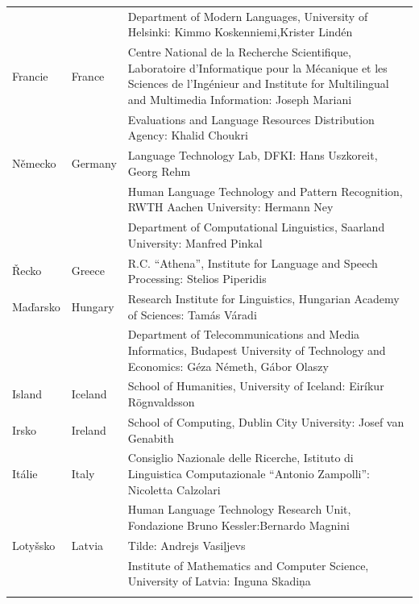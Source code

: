 \documentclass[]{../../metanetpaper}
\begin{document}
\begin{longtable}{@{}llp{113mm}@{}}
  & & Department of Modern Languages, University of Helsinki: Kimmo Koskenniemi,\newline Krister Lindén \\ \addlinespace
  Francie & \textcolor{grey1}{France} & Centre National de la Recherche Scientifique, Laboratoire d'Informatique pour la Mécanique et les Sciences de l'Ingénieur and Institute for Multilingual and Multimedia Information: Joseph Mariani \\ \addlinespace
  & & Evaluations and Language Resources Distribution Agency: Khalid Choukri\\ \addlinespace
  Německo & \textcolor{grey1}{Germany} & Language Technology Lab, DFKI: Hans Uszkoreit, Georg Rehm\\ \addlinespace
  & & Human Language Technology and Pattern Recognition, RWTH Aachen University: Hermann Ney \\ \addlinespace
  & & Department of Computational Linguistics, Saarland University: Manfred Pinkal\\ \addlinespace 
  Řecko & \textcolor{grey1}{Greece} & R.C. “Athena”, Institute for Language and Speech Processing: Stelios Piperidis\\ \addlinespace
  Maďarsko & \textcolor{grey1}{Hungary} & Research Institute for Linguistics, Hungarian Academy of Sciences: Tamás Váradi\\  \addlinespace
  & & Department of Telecommunications and Media Informatics, Budapest University of Technology and Economics: Géza Németh, Gábor Olaszy\\ \addlinespace
  Island & \textcolor{grey1}{Iceland} & School of Humanities, University of Iceland: Eiríkur Rögnvaldsson\\ \addlinespace
  Irsko & \textcolor{grey1}{Ireland} & School of Computing, Dublin City University: Josef van Genabith\\ \addlinespace
  Itálie & \textcolor{grey1}{Italy} & Consiglio Nazionale delle Ricerche, Istituto di Linguistica Computazionale “Antonio Zampolli”: Nicoletta Calzolari\\ \addlinespace
  & & Human Language Technology Research Unit, Fondazione Bruno Kessler:\newline Bernardo Magnini\\ \addlinespace
  Lotyšsko & \textcolor{grey1}{Latvia} & Tilde: Andrejs Vasiļjevs\\ \addlinespace 
  & & Institute of Mathematics and Computer Science, University of Latvia: Inguna Skadiņa\\ \addlinespace

\end{longtable}
\end{document}
